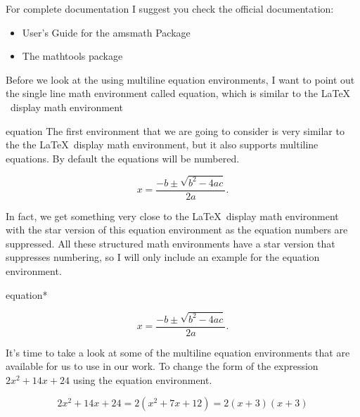For complete documentation I suggest you check the official documentation:
\begin{itemize}
  \item User’s Guide for the amsmath Package
  \item The mathtools package
\end{itemize}

Before we look at the using multiline equation environments, I want to point out
the single line math environment called equation, which is similar to the \LaTeX 
~display math environment 
 
\begin{docEnvironment*}[doclang/environment content=mathematics content goes here]{equation}{}{}
  The first environment that we are going to consider is very similar to the the \LaTeX ~display 
  math environment, but it also supports multiline equations.  By default the equations will 
  be numbered.
  \begin{dispExample}
    \begin{equation}
      x = \frac{-b \pm \sqrt{b^2 - 4ac}}{2a}.
    \end{equation}
    \end{dispExample}
\end{docEnvironment*}
In fact, we get something very close to the \LaTeX ~display math environment with 
the star version of this equation environment as the equation numbers are suppressed.
All these structured math environments have a star version that suppresses numbering,
so I will only include an example for the equation environment.
\begin{docEnvironment*}[doclang/environment content=mathematics content goes here]{equation*}{}{}
  \begin{dispExample}
    \begin{equation*}
      x = \frac{-b \pm \sqrt{b^2 - 4ac}}{2a}.
    \end{equation*}
    \end{dispExample}
  \end{docEnvironment*}
It's time to take a look at some of the multiline equation environments that are available
for us to use in our work. To change the form of the expression \( 2x^2 + 14x + 24 \) using 
the equation environment. 
\begin{dispExample}
  \begin{equation*}
    2x^2 + 14x + 24 = 2( x^2 + 7x + 12 ) = 2(x + 3)(x + 3)
    \end{equation*}
  \end{dispExample}

